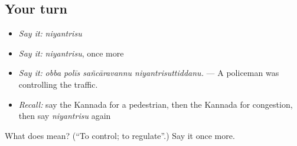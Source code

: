 \subsection*{Your turn}
\begin{itemize}
\raggedright
  \item \emph{Say it:} \emph{niyantrisu}
  \item \emph{Say it:} \emph{niyantrisu}, once more
  \item \emph{Say it:} \emph{obba polīs sañcāravannu niyantrisuttiddanu.} — A policeman was controlling the traffic.
  \item \emph{Recall:} say the Kannada for a pedestrian, then the Kannada for congestion, then say \emph{niyantrisu} again
\end{itemize}

\begin{tcolorbox}[breakable,colback=teal!4,colframe=teal!35!black,title={Before you move on}]
What does  mean? (\textquotedblleft{}To control; to regulate\textquotedblright{}.) Say it once more.
\end{tcolorbox}
